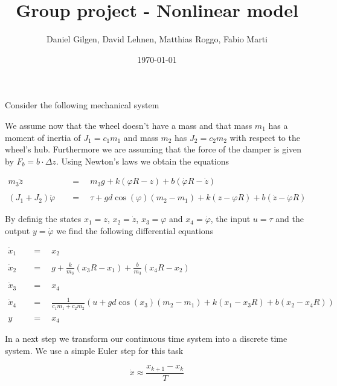 \documentclass{article}
\title{Group project - Nonlinear model}
\author{Daniel Gilgen, David Lehnen, Matthias Roggo, Fabio Marti}
\date{\today}
\begin{document}
\maketitle
\parindent 0pt
\linespread{1.2} \selectfont
{}
\parskip 10pt

Consider the following mechanical system

\begin{center}
\end{center}


We assume now that the wheel doesn't have a mass and that mass \(m_1\) has a moment of inertia of \(J_1 = c_1 m_1\) and mass \(m_2\) has \(J_2 = c_2 m_2\) with respect to the wheel's hub. Furthermore we are assuming that the force of the damper is given by \(F_b = b \cdot \Delta z\). Using Newton's laws we obtain the equations

\[
\begin{aligned}
m_3 \ddot{z}\quad &=\quad m_3 g + k (\varphi R - z) + b (\dot{\varphi}R - \dot{z}) \\\\
(J_1 + J_2)\ddot{\varphi}\quad &=\quad \tau + gd\cos(\varphi)(m_2 - m_1) + k(z - \varphi R) + b(\dot{z} - \dot{\varphi}R)
\end{aligned}
\]

By definig the states \(x_1 = z\), \(x_2 = \dot{z}\), \(x_3 = \varphi\) and \(x_4 = \dot{\varphi}\), the input \(u = \tau\) and the output \(y = \dot{\varphi}\) we find the following differential equations

\[
\begin{aligned}
\dot{x}_1\quad &=\quad x_2\\\\
\dot{x}_2\quad &=\quad g + \frac{k}{m_3} (x_3 R - x_1) + \frac{b}{m_3} (x_4 R - x_2)\\\\
\dot{x}_3\quad &=\quad x_4\\\\
\dot{x}_4\quad &=\quad \frac{1}{c_1 m_1 + c_2 m_2} \left( u + gd\cos(x_3)(m_2 - m_1) + k(x_1 - x_3 R) + b(x_2 - x_4R) \right) \\\\
y\quad &=\quad x_4
\end{aligned}
\]

In a next step we transform our continuous time system into a discrete time system. We use a simple Euler step for this task

\[\dot{x} \approx \frac{x_{k+1} - x_k}{T}\]
\end{document}

